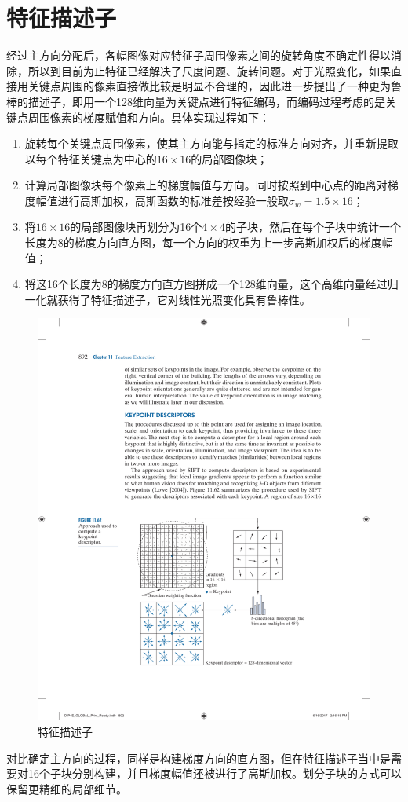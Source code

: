 \section{特征描述子}

经过主方向分配后，各幅图像对应特征子周围像素之间的旋转角度不确定性得以消除，所以到目前为止\sift 特征已经解决了尺度问题、旋转问题。对于光照变化，如果直接用\sift 关键点周围的像素直接做比较是明显不合理的，因此\sift 进一步提出了一种更为鲁棒的描述子，即用一个128维向量为关键点进行特征编码，而编码过程考虑的是关键点周围像素的梯度赋值和方向。具体实现过程如下：
\begin{enumerate}
    \item 旋转每个\sift 关键点周围像素，使其主方向能与指定的标准方向对齐，并重新提取以每个\sift 特征关键点为中心的$16\times 16$的局部图像块；
    \item 计算局部图像块每个像素上的梯度幅值与方向。同时按照到中心点的距离对梯度幅值进行高斯加权，高斯函数的标准差按经验一般取$\sigma_w=1.5\times 16$；
    \item 将$16\times 16$的局部图像块再划分为16个$4\times 4$的子块，然后在每个子块中统计一个长度为8的梯度方向直方图，每一个方向的权重为上一步高斯加权后的梯度幅值；
    \item 将这16个长度为8的梯度方向直方图拼成一个128维向量，这个高维向量经过归一化就获得了\sift 特征描述子，它对线性光照变化具有鲁棒性。
\end{enumerate}


\begin{figure}[H]
    \centering
    \includegraphics[width=.8\textwidth]{fig/Keypoint descriptor.pdf}
    \caption{\sift 特征描述子}
\end{figure}

\begin{remark}
    对比确定主方向的过程，同样是构建梯度方向的直方图，但在特征描述子当中是需要对16个子块分别构建，并且梯度幅值还被进行了高斯加权。划分子块的方式可以保留更精细的局部细节。
\end{remark}

